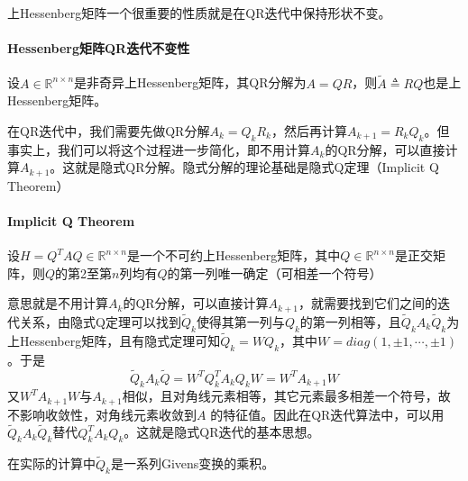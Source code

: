\documentclass[UTF8]{article}
\begin{document}
\begin{flushleft}
\textcolor[rgb]{0.00,0.07,1.00}{上Hessenberg矩阵一个很重要的性质就是在QR迭代中保持形状不变。}
\paragraph{Hessenberg矩阵QR迭代不变性}
设$A\in\mathbb{R}^{n \times n}$是非奇异上Hessenberg矩阵，其QR分解为$A=QR$，则$\tilde{A}\triangleq RQ$也是上Hessenberg矩阵。\newline

在QR迭代中，我们需要先做QR分解$A_k=Q_kR_k$，然后再计算$A_{k+1}=R_kQ_k$。但事实上，我们可以将这个过程进一步简化，即不用计算$A_k$的QR分解，可以直接计算$A_{k+1}$。这就是\textcolor[rgb]{0.00,0.07,1.00}{隐式QR分解}。隐式分解的理论基础是隐式Q定理（Implicit Q Theorem）

\paragraph{Implicit Q Theorem}
设$H=Q^TAQ\in\mathbb{R}^{n \times n}$是一个不可约上Hessenberg矩阵，其中$Q \in \mathbb{R}^{n \times n}$是正交矩阵，则$Q$的第2至第$n$列均有$Q$的第一列唯一确定（可相差一个符号）\newline

意思就是不用计算$A_k$的QR分解，可以直接计算$A_{k+1}$，就需要找到它们之间的迭代关系，由隐式Q定理可以找到$\tilde{Q}_k$使得其第一列与$Q_k$的第一列相等，且$\tilde{Q}_kA_k\tilde{Q}_k$为上Hessenberg矩阵，且有隐式定理可知$\tilde{Q}_k=WQ_k$，其中$W=diag(1,\pm 1,\cdots,\pm 1)$。于是
$$\tilde{Q}_kA_k\tilde{Q}=W^TQ^T_kA_kQ_kW=W^TA_{k+1}W$$
又$W^TA_{k+1}W$与$A_{k+1}$相似，且对角线元素相等，其它元素最多相差一个符号，故不影响收敛性，对角线元素收敛到$A$ 的特征值。因此在QR迭代算法中，可以用$\tilde{Q}_kA_k\tilde{Q}_k$替代$Q^T_kA_kQ_k$。这就是隐式QR迭代的基本思想。\newline

在实际的计算中$\tilde{Q}_k$是一系列Givens变换的乘积。
\end{flushleft}
\end{document}
